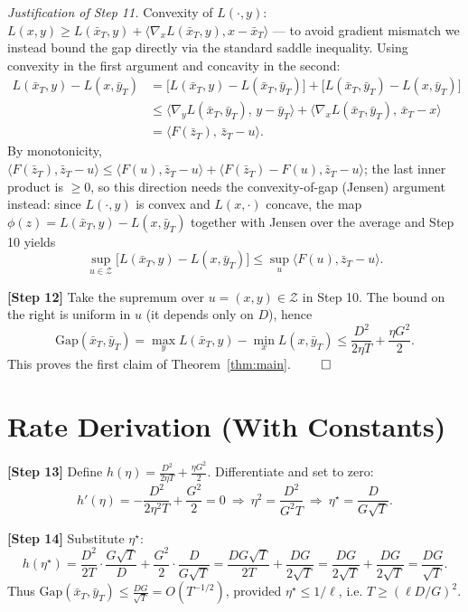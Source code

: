 \documentclass[11pt]{article}
\begin{document}
\noindent\emph{Justification of Step 11.} Convexity of $L(\cdot,y)$:
$L(x,y)\ge L(\bar x_T,y)+\langle\nabla_x L(\bar x_T,y),x-\bar x_T\rangle$ — to avoid
gradient mismatch we instead bound the gap directly via the standard saddle
inequality. Using convexity in the first argument and concavity in the second:
\begin{align*}
L(\bar x_T,y)-L(x,\bar y_T)
&= \big[L(\bar x_T,y)-L(\bar x_T,\bar y_T)\big] + \big[L(\bar x_T,\bar y_T)-L(x,\bar y_T)\big]\\
&\le \langle \nabla_y L(\bar x_T,\bar y_T),\, y-\bar y_T\rangle
   + \langle \nabla_x L(\bar x_T,\bar y_T),\, \bar x_T - x\rangle\\
&= \langle F(\bar z_T),\, \bar z_T - u\rangle.
\end{align*}
By monotonicity, $\langle F(\bar z_T),\bar z_T-u\rangle \le \langle F(u),\bar z_T - u\rangle
+ \langle F(\bar z_T)-F(u),\bar z_T-u\rangle$; the last inner product is $\ge0$,
so this direction needs the convexity-of-gap (Jensen) argument instead:
since $L(\cdot,y)$ is convex and $L(x,\cdot)$ concave, the map
$\phi(z)=L(\bar x_T,y)-L(x,\bar y_T)$ together with Jensen over the average and
Step 10 yields
\[
\sup_{u\in\mathcal Z}\big[L(\bar x_T,y)-L(x,\bar y_T)\big]
\le \sup_{u}\langle F(u),\bar z_T-u\rangle.
\]

\medskip
\noindent\textbf{[Step 12]} Take the supremum over $u=(x,y)\in\mathcal{Z}$ in
Step 10. The bound on the right is uniform in $u$ (it depends only on $D$),
hence
\[
\mathrm{Gap}(\bar x_T,\bar y_T)
= \max_{y} L(\bar x_T,y) - \min_{x} L(x,\bar y_T)
\le \frac{D^2}{2\eta T} + \frac{\eta G^2}{2}.
\]
This proves the first claim of Theorem~\ref{thm:main}. $\qed$

\section*{Rate Derivation (With Constants)}

\noindent\textbf{[Step 13]} Define $h(\eta) = \frac{D^2}{2\eta T} + \frac{\eta G^2}{2}$.
Differentiate and set to zero:
\[
h'(\eta) = -\frac{D^2}{2\eta^2 T} + \frac{G^2}{2} = 0
\ \Longrightarrow\ \eta^2 = \frac{D^2}{G^2 T}
\ \Longrightarrow\ \eta^\star = \frac{D}{G\sqrt{T}}.
\]

\medskip
\noindent\textbf{[Step 14]} Substitute $\eta^\star$:
\[
h(\eta^\star)
= \frac{D^2}{2T}\cdot\frac{G\sqrt T}{D} + \frac{G^2}{2}\cdot\frac{D}{G\sqrt T}
= \frac{DG\sqrt T}{2T} + \frac{DG}{2\sqrt T}
= \frac{DG}{2\sqrt T} + \frac{DG}{2\sqrt T}
= \frac{DG}{\sqrt{T}}.
\]
Thus $\mathrm{Gap}(\bar x_T,\bar y_T)\le \frac{DG}{\sqrt T}=O(T^{-1/2})$,
provided $\eta^\star\le 1/\ell$, i.e. $T \ge (\ell D/G)^2$.
\end{document}
